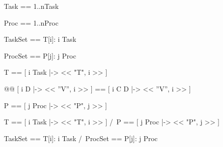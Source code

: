 \documentclass[msc]{mestrado}
\begin{document}
\begin{notla}
Task == 1..nTask
\end{notla}

\begin{notla}
Proc == 1..nProc
\end{notla}

\begin{notla}
TaskSet == { T[i]: i \in Task }
\end{notla}

\begin{notla}
ProcSet == { P[j]: j \in Proc }
\end{notla}

\begin{notla}
T == [ i \in Task |-> << "T", i >> ] 
\end{notla}
\begin{tlatex}
\end{tlatex}

\begin{tla}
[ i \in C |-> << "V", i >> ] @@ [ i \in D |-> << ''V'', i >> ] == [ i \in C \cup D |-> << ''V'', i >> ]
\end{tla}
\begin{tlatex}
\end{tlatex}

\begin{notla}
P == [ j \in Proc |-> << "P", j >> ]
\end{notla}
\begin{tlatex}
\end{tlatex}

\begin{notla}
T == [ i \in Task |-> << "T", i >> ]   /\  P == [ j \in Proc |-> << "P", j >> ]
\end{notla}
\begin{tlatex}
\end{tlatex}

\begin{notla}
TaskSet == { T[i]: i \in Task }  /\  ProcSet == { P[j]: j \in Proc }
\end{notla}
\begin{tlatex}
\end{tlatex}
\end{document}
